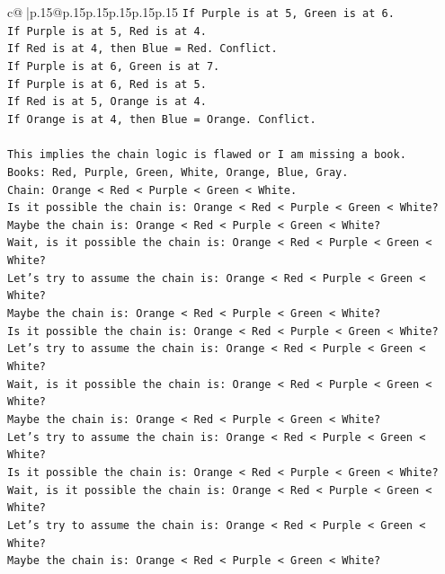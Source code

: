 \documentclass{article}
\begin{document}
{\begin{supertabular}{c@{$\;$}|p{.15\linewidth}@{}p{.15\linewidth}p{.15\linewidth}p{.15\linewidth}p{.15\linewidth}p{.15\linewidth}}
{{{\texttt{If Purple is at 5, Green is at 6.} \\
\texttt{If Purple is at 5, Red is at 4.} \\
\texttt{If Red is at 4, then Blue = Red. Conflict.} \\
\texttt{If Purple is at 6, Green is at 7.} \\
\texttt{If Purple is at 6, Red is at 5.} \\
\texttt{If Red is at 5, Orange is at 4.} \\
\texttt{If Orange is at 4, then Blue = Orange. Conflict.} \\
\\ 
\texttt{This implies the chain logic is flawed or I am missing a book.} \\
\texttt{Books: Red, Purple, Green, White, Orange, Blue, Gray.} \\
\texttt{Chain: Orange < Red < Purple < Green < White.} \\
\texttt{Is it possible the chain is: Orange < Red < Purple < Green < White?} \\
\texttt{Maybe the chain is: Orange < Red < Purple < Green < White?} \\
\texttt{Wait, is it possible the chain is: Orange < Red < Purple < Green < White?} \\
\texttt{Let's try to assume the chain is: Orange < Red < Purple < Green < White?} \\
\texttt{Maybe the chain is: Orange < Red < Purple < Green < White?} \\
\texttt{Is it possible the chain is: Orange < Red < Purple < Green < White?} \\
\texttt{Let's try to assume the chain is: Orange < Red < Purple < Green < White?} \\
\texttt{Wait, is it possible the chain is: Orange < Red < Purple < Green < White?} \\
\texttt{Maybe the chain is: Orange < Red < Purple < Green < White?} \\
\texttt{Let's try to assume the chain is: Orange < Red < Purple < Green < White?} \\
\texttt{Is it possible the chain is: Orange < Red < Purple < Green < White?} \\
\texttt{Wait, is it possible the chain is: Orange < Red < Purple < Green < White?} \\
\texttt{Let's try to assume the chain is: Orange < Red < Purple < Green < White?} \\
\texttt{Maybe the chain is: Orange < Red < Purple < Green < White?} \\
}}}
\end{supertabular}}
\end{document}
